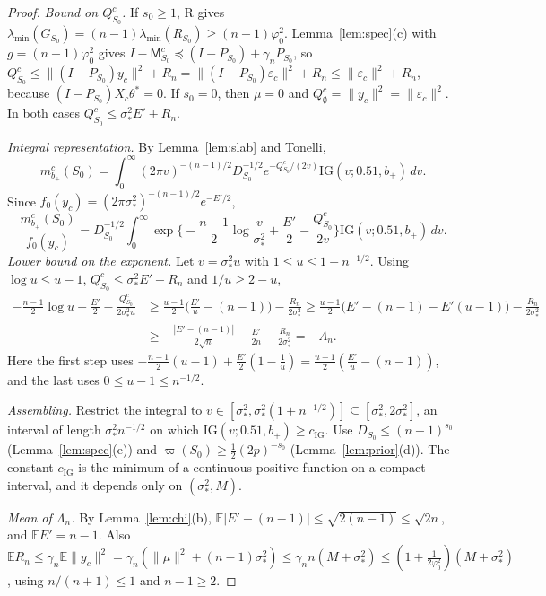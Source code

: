 \documentclass[11pt]{article}
\theoremstyle{remark}
\newcommand{\E}{\mathbb E}
\newcommand{\IG}{\mathrm{IG}}
\newcommand{\vp}{\varpi}
\newcommand{\yc}{y_c}
\newcommand{\Xc}{X_c}
\newcommand{\bp}{b_+}
\newcommand{\eps}{\varepsilon}
\begin{document}
\begin{proof}
\emph{Bound on $Q^c_{S_0}$.} If $s_0\ge1$, R gives $\lambda_{\min}(G_{S_0})=(n-1)\lambda_{\min}(R_{S_0})\ge(n-1)\varphi_0^2$. Lemma~\ref{lem:spec}(c) with $g=(n-1)\varphi_0^2$ gives $I-\mathsf{M}^c_{S_0}\preceq(I-P_{S_0})+\gamma_nP_{S_0}$, so
$Q^c_{S_0}\le\|(I-P_{S_0})\yc\|^2+R_n=\|(I-P_{S_0})\eps_c\|^2+R_n\le\|\eps_c\|^2+R_n$, because $(I-P_{S_0})\Xc\theta^*=0$. If $s_0=0$, then $\mu=0$ and $Q^c_\emptyset=\|\yc\|^2=\|\eps_c\|^2$. In both cases $Q^c_{S_0}\le\sigma_*^2E'+R_n$.

\emph{Integral representation.} By Lemma~\ref{lem:slab} and Tonelli,
\[
m^c_{\bp}(S_0)=\int_0^\infty(2\pi v)^{-(n-1)/2}D_{S_0}^{-1/2}e^{-Q^c_{S_0}/(2v)}\IG(v;0.51,\bp)\,dv .
\]
Since $f_0(\yc)=(2\pi\sigma_*^2)^{-(n-1)/2}e^{-E'/2}$,
\[
\frac{m^c_{\bp}(S_0)}{f_0(\yc)}=D_{S_0}^{-1/2}\int_0^\infty\exp\Big\{-\frac{n-1}2\log\frac v{\sigma_*^2}+\frac{E'}2-\frac{Q^c_{S_0}}{2v}\Big\}\IG(v;0.51,\bp)\,dv .
\]
\emph{Lower bound on the exponent.} Let $v=\sigma_*^2u$ with $1\le u\le1+n^{-1/2}$. Using $\log u\le u-1$, $Q^c_{S_0}\le\sigma_*^2E'+R_n$ and $1/u\ge2-u$,
\begin{align*}
-\frac{n-1}2\log u+\frac{E'}2-\frac{Q^c_{S_0}}{2\sigma_*^2u}
&\ge\frac{u-1}2\Big(\frac{E'}u-(n-1)\Big)-\frac{R_n}{2\sigma_*^2}
\ge\frac{u-1}2\big(E'-(n-1)-E'(u-1)\big)-\frac{R_n}{2\sigma_*^2}\\
&\ge-\frac{|E'-(n-1)|}{2\sqrt n}-\frac{E'}{2n}-\frac{R_n}{2\sigma_*^2}=-\Lambda_n .
\end{align*}
Here the first step uses $-\frac{n-1}2(u-1)+\frac{E'}2(1-\frac1u)=\frac{u-1}2(\frac{E'}u-(n-1))$, and the last uses $0\le u-1\le n^{-1/2}$.

\emph{Assembling.} Restrict the integral to $v\in[\sigma_*^2,\sigma_*^2(1+n^{-1/2})]\subseteq[\sigma_*^2,2\sigma_*^2]$, an interval of length $\sigma_*^2n^{-1/2}$ on which $\IG(v;0.51,\bp)\ge c_{\IG}$. Use $D_{S_0}\le(n+1)^{s_0}$ (Lemma~\ref{lem:spec}(e)) and $\vp(S_0)\ge\frac12(2p)^{-s_0}$ (Lemma~\ref{lem:prior}(d)). The constant $c_{\IG}$ is the minimum of a continuous positive function on a compact interval, and it depends only on $(\sigma_*^2,M)$.

\emph{Mean of $\Lambda_n$.} By Lemma~\ref{lem:chi}(b), $\E|E'-(n-1)|\le\sqrt{2(n-1)}\le\sqrt{2n}$, and $\E E'=n-1$. Also $\E R_n\le\gamma_n\E\|\yc\|^2=\gamma_n(\|\mu\|^2+(n-1)\sigma_*^2)\le\gamma_nn(M+\sigma_*^2)\le(1+\frac1{2\varphi_0^2})(M+\sigma_*^2)$, using $n/(n+1)\le1$ and $n-1\ge2$.
\end{proof}
\end{document}
